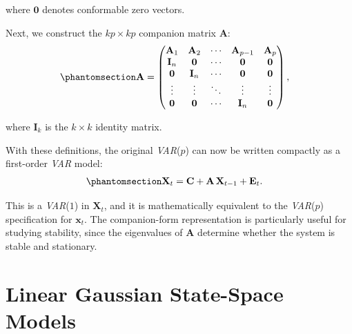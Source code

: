 \documentclass[
  letterpaper,
  DIV=11,
  numbers=noendperiod]{scrreprt}
\begin{document}
where \(\mathbf{0}\) denotes conformable zero vectors.

Next, we construct the \(kp \times kp\) companion matrix \(\mathbf{A}\):
\begin{equation}\protect\phantomsection\label{eq-gen-0093}{  
\begin{align}
    \mathbf{A} &=
    \begin{pmatrix}
        \mathbf{A}_1 & \mathbf{A}_2 & \cdots & \mathbf{A}_{p-1} & \mathbf{A}_p \\
        \mathbf{I}_n & \mathbf{0}   & \cdots & \mathbf{0}       & \mathbf{0}   \\
        \mathbf{0}   & \mathbf{I}_n & \cdots & \mathbf{0}       & \mathbf{0}   \\
        \vdots       & \vdots       & \ddots & \vdots           & \vdots       \\
        \mathbf{0}   & \mathbf{0}   & \cdots & \mathbf{I}_n     & \mathbf{0}
    \end{pmatrix},
\end{align}
}\end{equation}

where \(\mathbf{I}_k\) is the \(k \times k\) identity matrix.

With these definitions, the original \emph{VAR}(\(p\)) can now be
written compactly as a first-order \emph{VAR} model:
\begin{equation}\protect\phantomsection\label{eq-gen-0094}{  
\begin{align}
    \mathbf{X}_t &= \mathbf{C} + \mathbf{A}\,\mathbf{X}_{t-1} + \mathbf{E}_t.
\end{align}
}\end{equation}

This is a \emph{VAR}(\(1\)) in \(\mathbf{X}_t\), and it is
mathematically equivalent to the \emph{VAR}(\(p\)) specification for
\(\mathbf{x}_t\). The companion-form representation is particularly
useful for studying stability, since the eigenvalues of \(\mathbf{A}\)
determine whether the system is stable and stationary.

\section{Linear Gaussian State-Space Models}\label{sec:LSSM}
\end{document}
